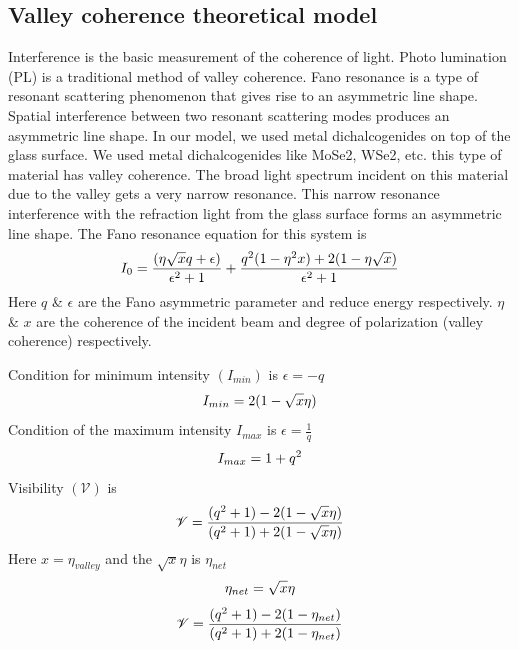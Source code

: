 \documentclass[13pt]{article}
\begin{document}
\subsection{Valley coherence theoretical model}
\noindent
\par 
	Interference is the basic measurement of the coherence of light. Photo lumination (PL) is a traditional method of valley coherence. Fano resonance is a type of resonant scattering phenomenon that gives rise to an asymmetric line shape. Spatial interference between two resonant scattering modes produces an asymmetric line shape. In our model, we used metal dichalcogenides on top of the glass surface. We used metal dichalcogenides like MoSe2, WSe2, etc. this type of material has valley coherence. The broad light spectrum incident on this material due to the valley gets a very narrow resonance. This narrow resonance interference with the refraction light from the glass surface forms an asymmetric line shape. The Fano resonance equation for this system is 
\begin{equation}
	\centering
	I_0 = \frac{(\eta \sqrt{x} q +\epsilon)}{\epsilon^2 + 1} + 
	\frac{q^2 (1 - \eta^2 x) + 2 (1 - \eta \sqrt{x})}{\epsilon^2 + 1}
	\label{eqs:valley coherence Fano equation}
\end{equation}
	Here $q$ \& $\epsilon$  are the Fano asymmetric parameter and reduce energy respectively. $\eta$ \& $x$ are the coherence of the incident beam and degree of polarization (valley coherence) respectively. 
\par 
Condition for minimum intensity $(I_{min})$ is $\epsilon = -q$
\begin{equation}
	\centering
	I_{min} = 2(1 - \sqrt{x} \eta)
\end{equation}
	Condition of the maximum intensity $I_{max}$ is $\epsilon = \frac{1}{q}$
\begin{equation}
	\centering
	I_{max} = 1 + q^2
\end{equation}
Visibility $(\mathscr{V})$ is 
\begin{equation}
	\centering
	\mathscr{V} = \frac{(q^2 + 1) - 2 (1 - \sqrt{x} \eta)}{(q^2 + 1) + 2 (1 -\sqrt{x} \eta)}
\end{equation}
	Here $x = \eta_{valley}$ and the $\sqrt{x} \eta$ is $\eta_{net}$
\begin{equation}
	\centering
	\eta_{net} = \sqrt{x} \eta
	\label{eqs:eta_net}
\end{equation}
\begin{equation}
	\centering
	\mathscr{V} = \frac{(q^2 + 1) -2 (1 -\eta_{net})}{(q^2 + 1) +2 (1 - \eta_{net})}
\end{equation}
\end{document}
